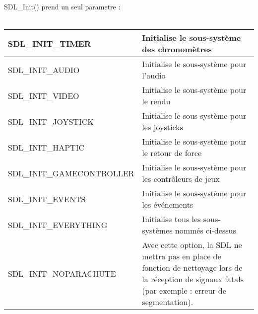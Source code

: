 \documentclass[a4paper,12pt,openany]{book}
\begin{document}
SDL_Init() prend un seul parametre : \\
\\
\begin{center}
\begin{tabular}{|l|l|}
\hline
SDL_INIT_TIMER & Initialise le sous-système des chronomètres\\ \hline
SDL_INIT_AUDIO & Initialise le sous-système pour l'audio\\ \hline
SDL_INIT_VIDEO & Initialise le sous-système pour le rendu\\ \hline
SDL_INIT_JOYSTICK & Initialise le sous-système pour les joysticks\\ \hline
SDL_INIT_HAPTIC & Initialise le sous-système pour le retour de force\\ \hline
SDL_INIT_GAMECONTROLLER & Initialise le sous-système pour les contrôleurs de jeux\\ \hline
SDL_INIT_EVENTS &Initialise le sous-système pour les événements\\ \hline
SDL_INIT_EVERYTHING & Initialise tous les sous-systèmes nommés ci-dessus\\ \hline
SDL_INIT_NOPARACHUTE & Avec cette option, la SDL ne mettra pas en place de fonction de nettoyage lors de la réception de signaux fatals (par exemple : erreur de segmentation).\\ \hline
\end{tabular}
\end{center}
\end{document}
